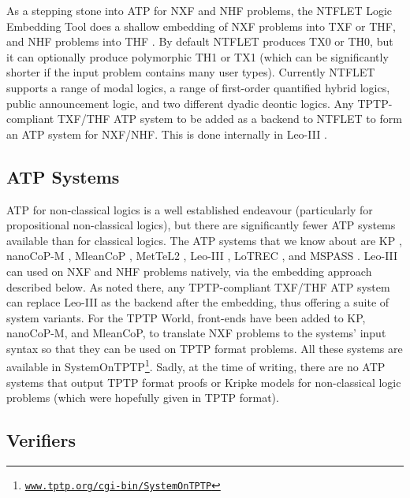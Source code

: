 \documentclass[runningheads]{llncs}
\begin{document}
As a stepping stone into ATP for NXF and NHF problems, the NTFLET Logic Embedding Tool 
\cite{Ste22-LE} does a shallow embedding of NXF problems into TXF or THF, and NHF problems
into THF \cite{BP13,BR13,GSB17,GS18}.
By default NTFLET produces TX0 or TH0, but it can optionally produce polymorphic TH1 or TX1
(which can be significantly shorter if the input problem contains many user types).
Currently NTFLET supports a range of modal logics, a range of first-order quantified hybrid 
logics, public announcement logic, and two different dyadic deontic logics.
Any TPTP-compliant TXF/THF ATP system to be added as a backend to NTFLET to form an 
ATP system for NXF/NHF.
This is done internally in Leo-III \cite{SB21,Ste22}.

\subsection{ATP Systems}
\label{ATPSystems}

ATP for non-classical logics is a well established endeavour (particularly for propositional
non-classical logics), but there are significantly fewer ATP systems available than for classical 
logics.
The ATP systems that we know about are
K\raisebox{-3pt}{S}P \cite{NHD20,PN+21}, nanoCoP-M \cite{Ott21}, MleanCoP \cite{Ott14}, 
MetTeL2 \cite{TSK12}, Leo-III \cite{SB21}, LoTREC \cite{FF+01}, and MSPASS \cite{HS00-TABLEAUX}.
Leo-III can used on NXF and NHF problems natively, via the embedding approach described below.
As noted there, any TPTP-compliant TXF/THF ATP system can replace Leo-III as the backend after
the embedding, thus offering a suite of system variants.
For the TPTP World, front-ends have been added to K\raisebox{-3pt}{S}P, nanoCoP-M, and MleanCoP,
to translate NXF problems to the systems' input syntax so that they can be used on TPTP
format problems.
All these systems are available in SystemOnTPTP\footnote{%
\href{https://www.tptp.org/cgi-bin/SystemOnTPTP}{\tt www.tptp.org/cgi-bin/SystemOnTPTP}}.
Sadly, at the time of writing, there are no ATP systems that output TPTP format proofs or 
Kripke models for non-classical logic problems (which were hopefully given in TPTP format).

\subsection{Verifiers}
\label{Verifiers}
\end{document}
